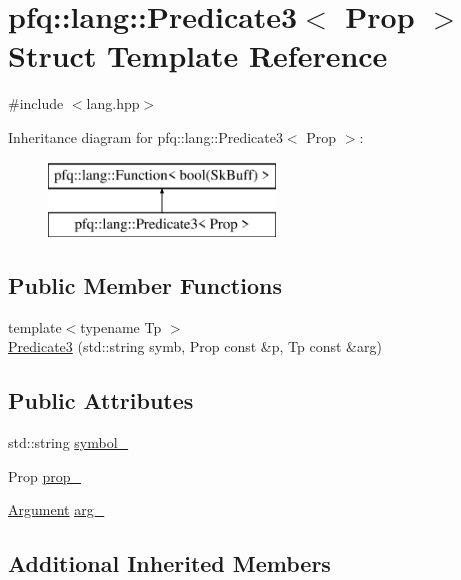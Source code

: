 \hypertarget{structpfq_1_1lang_1_1Predicate3}{\section{pfq\+:\+:lang\+:\+:Predicate3$<$ Prop $>$ Struct Template Reference}
\label{structpfq_1_1lang_1_1Predicate3}
}


{\ttfamily \#include $<$lang.\+hpp$>$}

Inheritance diagram for pfq\+:\+:lang\+:\+:Predicate3$<$ Prop $>$\+:\begin{figure}[H]
\begin{center}
\leavevmode
\includegraphics[height=2.000000cm]{structpfq_1_1lang_1_1Predicate3}
\end{center}
\end{figure}
\subsection*{Public Member Functions}
\begin{DoxyCompactItemize}
\item 
{\footnotesize template$<$typename Tp $>$ }\\\hyperlink{structpfq_1_1lang_1_1Predicate3_af611d8b8590ba02d3f8b8cb93e53fefb}{Predicate3} (std\+::string symb, Prop const \&p, Tp const \&arg)
\end{DoxyCompactItemize}
\subsection*{Public Attributes}
\begin{DoxyCompactItemize}
\item 
std\+::string \hyperlink{structpfq_1_1lang_1_1Predicate3_a118f41c3c92a3d0167a6730f26266799}{symbol\+\_\+}
\item 
Prop \hyperlink{structpfq_1_1lang_1_1Predicate3_af8363ba6bc8746cdf6b2b180f56f2e27}{prop\+\_\+}
\item 
\hyperlink{structpfq_1_1lang_1_1Argument}{Argument} \hyperlink{structpfq_1_1lang_1_1Predicate3_a5e5d800f6e5b70071015e5be58e77778}{arg\+\_\+}
\end{DoxyCompactItemize}
\subsection*{Additional Inherited Members}


